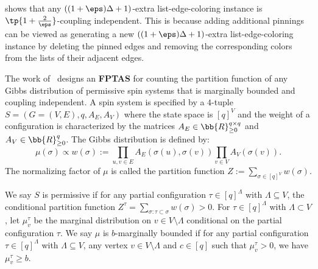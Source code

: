  shows that any $((1+\eps)\Delta+1)$-extra list-edge-coloring instance is $\tp{1+ \frac{2}{\eps}}$-coupling independent. This is because adding additional pinnings can be viewed as generating a new $((1+\eps)\Delta+1)$-extra list-edge-coloring instance by deleting the pinned edges and removing the corresponding colors from the lists of their adjacent edges. 

The work of~\cite{CFGZZ24} designs an \textbf{FPTAS} for counting the partition function of any Gibbs distribution of permissive spin systems that is marginally bounded and coupling independent. A spin system is specified by a $4$-tuple $S=(G = (V,E),q, A_E, A_V)$ where the state space is $[q]^V$ and the weight of a configuration is characterized by the matrices $A_E \in \bb{R}_{\geq 0}^{q\times q}$ and $A_V \in \bb{R}_{\geq 0}^q$. The Gibbs distribution is defined by:
\[
\mu(\sigma)\propto w(\sigma):=\prod_{u,v\in E} A_E(\sigma(u),\sigma(v))\prod_{v\in V} A_V(\sigma(v)).
\]
The normalizing factor of $\mu$ is called the partition function $Z:=\sum_{\sigma\in [q]^V}w(\sigma)$.

We say $S$ is permissive if for any partial configuration $\tau \in [q]^\Lambda$ with $\Lambda \subseteq V$, the conditional partition function $Z^\tau = \sum_{\sigma:\tau\subset \sigma} w(\sigma) >0$. For $\tau\in [q]^\Lambda$ with $\Lambda \subset V$, let $\mu_v^\tau$ be the marginal distribution on $v\in V\setminus \Lambda$ conditional on the partial configuration $\tau$. We say $\mu$ is $b$-marginally bounded if for any partial configuration $\tau \in [q]^\Lambda$ with $\Lambda \subseteq V$, any vertex $v \in V\setminus \Lambda$ and $c\in [q]$ such that $\mu_v^\tau>0$, we have $\mu_v^\tau\geq b$.


